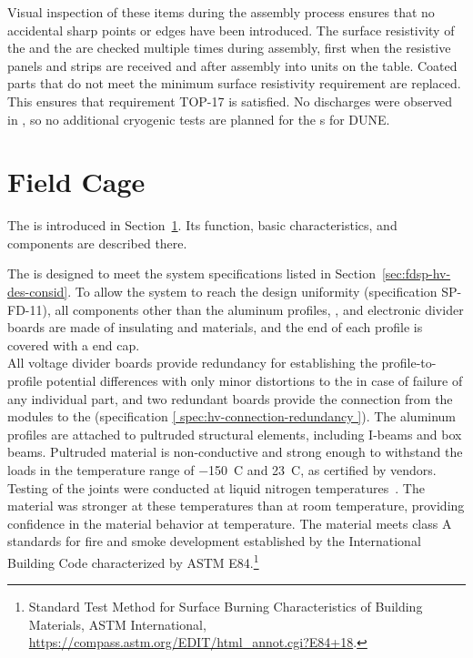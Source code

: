 Visual inspection of these items during the assembly process ensures that no accidental sharp points or edges have been introduced. The surface resistivity of the   and the  are checked multiple times during assembly, first when the resistive panels and strips are received and after assembly into  units on the table.  Coated parts that do not meet the minimum surface resistivity requirement are replaced.  This ensures that requirement TOP-17 is satisfied. No discharges were observed in , so no additional cryogenic tests are planned for the s for DUNE.



\section{Field Cage}
\label{sec:fdsp-hv-des-fc}


The  is introduced in Section~\ref{sec:fdsp-hv-des-fc}. Its function, basic characteristics, and components are described there. 

The  %
is designed to %
meet the system specifications listed in Section~\ref{sec:fdsp-hv-des-consid}. %
To allow the system to reach the design \efield{} uniformity 
(specification SP-FD-11), 
all components other than the aluminum profiles, , and electronic divider boards are made of insulating  and \frfour materials, and the end of each profile is covered with a  end cap. \\

All voltage divider boards provide redundancy for establishing the profile-to-profile potential differences with only minor distortions to the \efield in case of failure of any individual part, and two redundant boards provide the connection from the  modules to the  
(specification \ref{ spec:hv-connection-redundancy }).  
The aluminum profiles are attached to  pultruded structural elements, including I-beams and box beams.  
Pultruded  material is non-conductive and strong enough to withstand the  loads  in the temperature range of \SI{-150}{C} and \SI{23}{C}, as certified by vendors. Testing of the  joints were conducted at liquid nitrogen temperatures~\cite{bib:docdb1504}. 
The material was stronger at these temperatures than at room temperature, 
providing confidence in the material behavior at \lar  temperature. The  material meets class A standards for fire and smoke development established by the International Building Code characterized by ASTM E84.\footnote{Standard Test Method for Surface Burning Characteristics of Building Materials, ASTM International, \url{https://compass.astm.org/EDIT/html_annot.cgi?E84+18}.}

